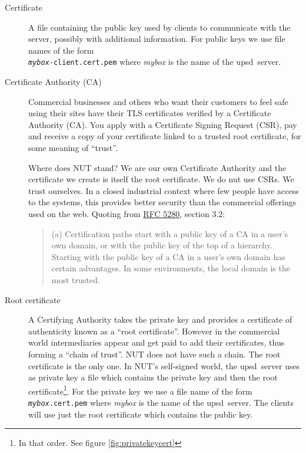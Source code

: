 \documentclass[12pt]{article}
\newcommand{\upsd}{\mbox{\textcolor{UPSDCOLOUR}{upsd}}}
\newcommand{\RFCkey}{\href{https://www.rfc-editor.org/info/rfc5280}%
                          {RFC 5280}}
\begin{document}
\begin{description}

\item[Certificate] A file containing the public key used by clients to
  communicate with the server, possibly with additional information.  For
  public keys we use file names of the form \\ 
  \texttt{\textit{mybox}-client.cert.pem} where \textit{mybox} is the name
  of the \upsd\ server.
  
\item[Certificate Authority (CA)] Commercial businesses and others who
  want their customers to feel safe using their sites have their TLS
  certificates verified by a Certificate Authority (CA). You apply
  with a Certificate Signing Request (CSR), pay and receive a copy of
  your certificate linked to a trusted root certificate, for some
  meaning of ``trust''.

  Where does NUT stand?  We are our own Certificate Authority and the
  certificate we create is itself the root certificate.  We do nut use
  CSRs.  We trust ourselves.  In a closed industrial context where few
  people have access to the systems, this provides better security
  than the commercial offerings used on the web.  Quoting from
  \RFCkey, section 3.2:
\begin{quotation}
  (a)  Certification paths start with a public key of a CA in a
       user's own domain, or with the public key of the top of a
       hierarchy.  Starting with the public key of a CA in a user's
       own domain has certain advantages.  In some environments, the
       local domain is the most trusted.
\end{quotation}

\item[Root certificate] A Certifying Authority takes the private key
  and provides a certificate of authenticity known as a ``root
  certificate''.  However in the commercial world intermediaries
  appear and get paid to add their certificates, thus forming a
  ``chain of trust''.  NUT does not have such a chain.  The root
  certificate is the only one.  In NUT's self-signed world, the
  \upsd\ server uses as private key a file which contains the private
  key and then the root certificate\footnote{In that order.  See
  figure \ref{fig:privatekeycert}}.  For the private key we use a file
  name of the form \texttt{\textit{mybox}.cert.pem} where
  \textit{mybox} is the name of the \upsd\ server.  The clients will
  use just the root certificate which contains the public key.


\end{description}
\end{document}

